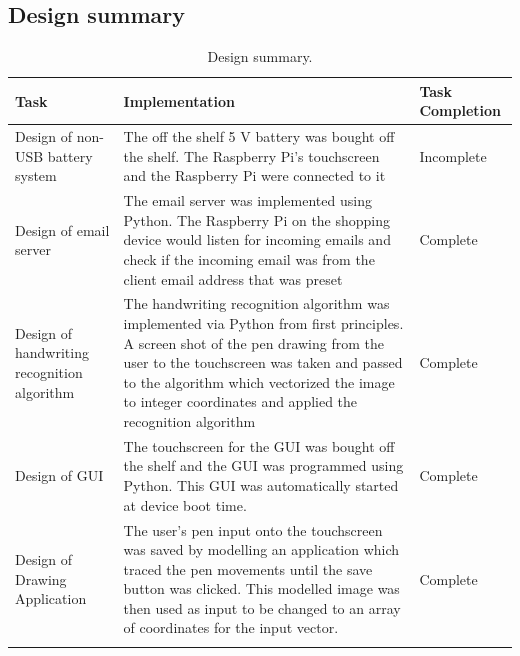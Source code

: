 \subsection{Design summary}
\begin{center}
	\begin{longtable}{|p{4cm}|p{7cm}|p{5cm}|}
		\hline 
		\textbf{Task} &
		\textbf{Implementation} &
		\textbf{Task Completion}
		\\
		\hline
		Design of non-USB battery system& The off the shelf 5 V battery was bought off the shelf. The Raspberry Pi's touchscreen and the Raspberry Pi were connected to it & Incomplete\\
		\hline
		Design of email server
		&  The email server was implemented using Python. The Raspberry Pi on the shopping device would listen for incoming emails and check if the incoming email was from the client email address that was preset &  Complete\\
		\hline
		Design of handwriting recognition algorithm
		 &  The handwriting recognition algorithm was implemented via Python from first principles. A screen shot of the pen drawing from the user to the touchscreen was taken and passed to the algorithm which vectorized the image to integer coordinates and applied the recognition algorithm& Complete\\
		 \hline
		 Design of GUI
		 &  The touchscreen for the GUI was bought off the shelf and the GUI was programmed using Python. This GUI was automatically started at device boot time.& Complete\\
		 \hline
		 Design of Drawing Application
		&  The user's pen input onto the touchscreen was saved by modelling an application which traced the pen movements until the save button was clicked. This modelled image was then used as input to be changed to an array of coordinates for the input vector.& Complete\\		 
		
		\hline
		\caption{Design summary.}
	\end{longtable}
\end{center}
\newpage



